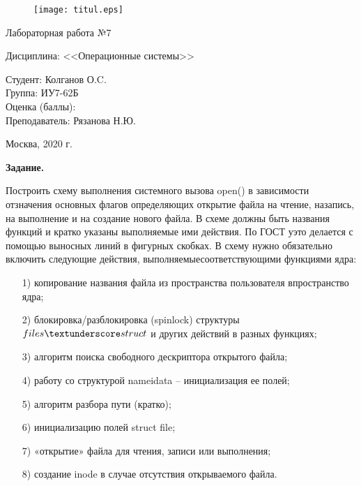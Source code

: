 \documentclass[a4paper,12pt]{article} %
\begin{document}
\begin{figure}[h!]
	\begin{center}
		{\texttt{[image: titul.eps]}}
	\end{center}
\end{figure}


\huge
\begin{center}
	Лабораторная работа №7
\end{center}

\vspace*{10mm}

\LARGE
\begin{center}
	Дисциплина: <<Операционные системы>>
\end{center}

\vspace*{20mm}

\large
\begin{flushleft}
	Студент: Колганов О.C. \\
	Группа: ИУ7-62Б \\
	Оценка (баллы): \\
	Преподаватель: Рязанова Н.Ю.
\end{flushleft}

\vspace*{50mm}

\large
\begin{center}
	Москва, 2020 г.
\end{center}

\thispagestyle{empty}

\newpage
\textbf{Задание.}

Построить схему выполнения системного вызова open() в зависимости отзначения основных флагов определяющих открытие файла на чтение, назапись, на выполнение и на создание нового файла. В схеме должны быть названия функций и кратко указаны выполняемые ими действия. По ГОСТ уэто делается с помощью выносных линий в фигурных скобках. 
В схему нужно обязательно включить следующие действия, выполняемыесоответствующими функциями ядра:
\begin{itemize}
\item[1)] копирование названия файла из пространства пользователя впространство ядра;
\item[2)] блокировка/разблокировка (spinlock) структуры $files \textunderscore struct$ и других действий в разных функциях;
\item[3)] алгоритм поиска свободного дескриптора открытого файла;
\item[4)] работу со структурой nameidata – инициализация ее полей;
\item[5)] алгоритм разбора пути (кратко);
\item[6)] инициализацию полей struct file;
\item[7)] «открытие» файла для чтения, записи или выполнения;
\item[8)] создание inode в случае отсутствия открываемого файла.
\end{itemize}
\end{document}
